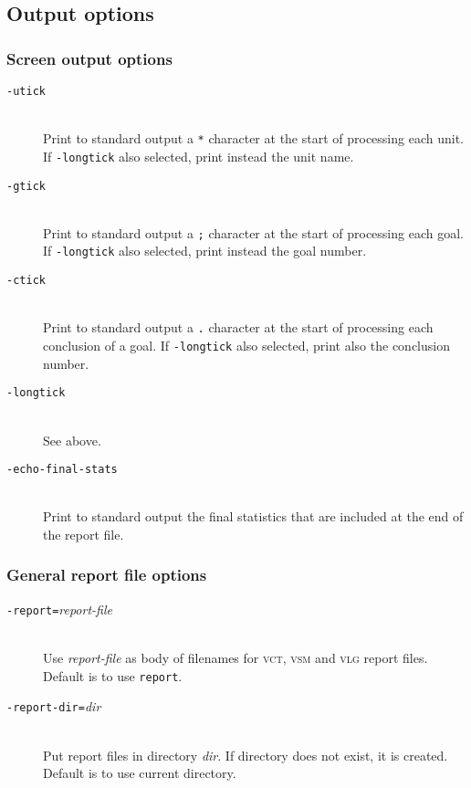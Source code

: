 \documentclass[12pt,fleqn]{article}
\newcommand{\logfile}{\textsc{vlg}}
\newcommand{\csv}{\textsc{vct}}
\newcommand{\sumfile}{\textsc{vsm}}
\newcommand{\optionb}[1]{\item[\texttt{-{#1}}]\ \\}
\newcommand{\optionv}[2]{\item[\texttt{-{#1}=}\mdseries\textit{#2}]\ \\}
\begin{document}
\subsection{Output options}


\subsubsection{Screen output options}

\begin{description}
\optionb{utick} Print to standard output a \texttt{*} character at the 
  start of processing each unit.
  If \texttt{-longtick} also selected, print instead 
  the unit name.
\optionb{gtick} Print to standard output a \texttt{;} character at the 
  start of processing each goal.  
  If \texttt{-longtick} also selected, print instead 
  the goal number.
\optionb{ctick} Print to standard output a \texttt{.} character at the 
  start of processing each conclusion of a goal.
  If \texttt{-longtick} also selected, print also
  the conclusion number.
\optionb{longtick} See above.

\optionb{echo-final-stats}
  Print to standard output the final statistics that are included at the
  end of the report file.
\end{description}


\subsubsection{General report file options}

\begin{description}
\optionv{report}{report-file}
   Use \textit{report-file} as body of filenames for \csv{}, \sumfile{} and
   \logfile{} report files.  Default is to use \texttt{report}.

\optionv{report-dir}{dir}
   Put report files in directory \textit{dir}.  If directory does not exist,
   it is created.  Default is to use current directory.
\end{description}
\end{document}
